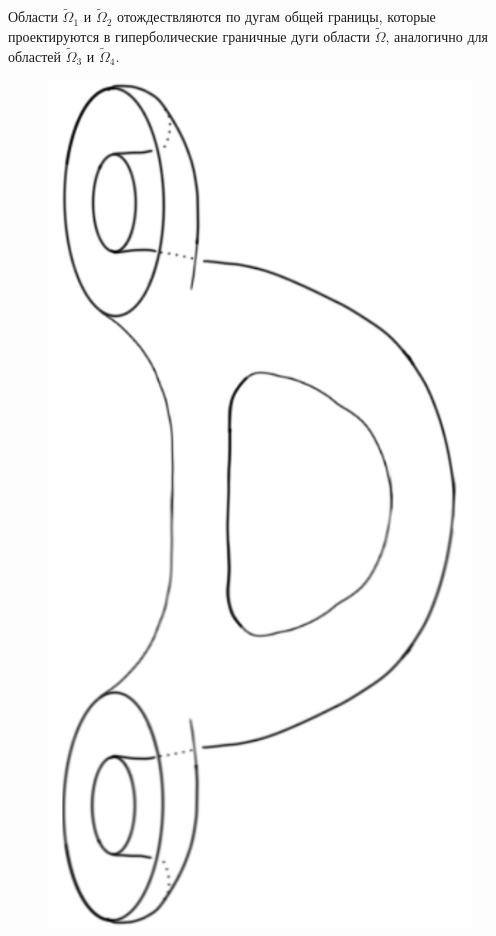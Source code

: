 Области $\widetilde{\Omega}_1$ и $\widetilde{\Omega}_2$ отождествляются по дугам общей границы, которые проектируются в гиперболические граничные дуги области $\widetilde{\Omega}$, аналогично для областей $\widetilde{\Omega}_3$ и $\widetilde{\Omega}_4$. 
\begin{figure}[!htb]
\centering
\includegraphics[scale=0.2]{images/section2/atoms/atom_3_step.pdf}

\end{figure}
